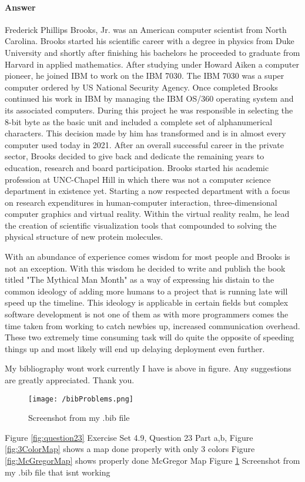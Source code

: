 \documentclass{article}
\begin{document}
\paragraph{Answer}

Frederick Phillips Brooks, Jr. was an American computer scientist from North Carolina. Brooks started his scientific career
with a degree in physics from Duke University and shortly after finishing his bachelors he proceeded to graduate from Harvard in applied mathematics.
After studying under Howard Aiken a computer pioneer, he joined IBM to work on the IBM 7030. The IBM 7030 was a super computer ordered by US National Security Agency.
Once completed Brooks continued his work in IBM by managing the IBM OS/360 operating system and its associated computers. During this project he was responsible in
selecting the 8-bit byte as the basic unit and included a complete set of alphanumerical characters. This decision made by him has transformed and is in almost every computer
used today in 2021. After an overall successful career in the private sector, Brooks decided to give back and dedicate the remaining years to education,
research and board participation. Brooks started his academic profession at UNC-Chapel Hill in which there was not a computer science department in existence yet.
Starting a now respected department with a focus on research expenditures in human-computer interaction, three-dimensional computer graphics and virtual reality.
Within the virtual reality realm, he lead the creation of scientific visualization tools that compounded to solving the physical structure of new protein molecules.

With an abundance of experience comes wisdom for most people and Brooks is not an exception. With this wisdom he decided to write and publish the
book titled "The Mythical Man Month" as a way of expressing his distain to the common ideology of adding more humans to a project that is running late
will speed up the timeline. This ideology is applicable in certain fields but complex software development is not one of them as with more programmers comes the time
taken from working to catch newbies up, increased communication overhead. These two extremely time consuming task will do quite the opposite of speeding things up and most likely
will end up delaying deployment even further.



\newpage



My bibliography wont work currently I have is above in figure. Any suggestions are greatly appreciated. Thank you.
\begin{figure}
  \texttt{[image: /bibProblems.png]}
  \caption{Screenshot from my .bib file}
  \label{fig:bibProblems}
\end{figure}

Figure \ref{fig:question23} Exercise Set 4.9, Question 23 Part a,b, \newline
Figure \ref{fig:3ColorMap} shows a map done properly with only 3 colors \newline
Figure \ref{fig:McGregorMap} shows properly done McGregor Map \newline
Figure \ref{fig:bibProblems} Screenshot from my .bib file that isnt working
\end{document}
